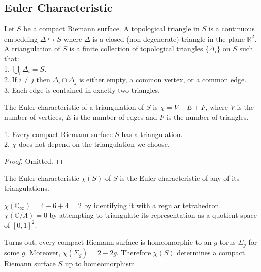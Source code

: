 \subsection{Euler Characteristic}
\begin{definition}
    Let $S$ be a compact Riemann surface.
    A topological triangle in $S$ is a continuous embedding $\Delta\hookrightarrow S$ where $\Delta$ is a closed (non-degenerate) triangle in the plane $\mathbb R^2$.
    A triangulation of $S$ is a finite collection of topological triangles $\{\Delta_i\}$ on $S$ such that:\\
    1. $\bigcup_i\Delta_i=S$.\\
    2. If $i\neq j$ then $\Delta_i\cap\Delta_j$ is either empty, a common vertex, or a common edge.\\
    3. Each edge is contained in exactly two triangles.
\end{definition}
\begin{definition}
    The Euler characteristic of a triangulation of $S$ is $\chi=V-E+F$, where $V$ is the number of vertices, $E$ is the number of edges and $F$ is the number of triangles.
\end{definition}
\begin{lemma}
    1. Every compact Riemann surface $S$ has a triangulation.\\
    2. $\chi$ does not depend on the triangulation we choose.
\end{lemma}
\begin{proof}
    Omitted.
\end{proof}
\begin{definition}
    The Euler characteristic $\chi(S)$ of $S$ is the Euler characteristic of any of its triangulations.
\end{definition}
\begin{example}
    $\chi(\mathbb C_\infty)=4-6+4=2$ by identifying it with a regular tetrahedron.
    $\chi(\mathbb C/\Lambda)=0$ by attempting to triangulate its representation as a quotient space of $[0,1]^2$.
\end{example}
Turns out, every compact Riemann surface is homeomorphic to an $g$-torus $\Sigma_g$ for some $g$.
Moreover, $\chi(\Sigma_g)=2-2g$.
Therefore $\chi(S)$ determines a compact Riemann surface $S$ up to homeomorphism.